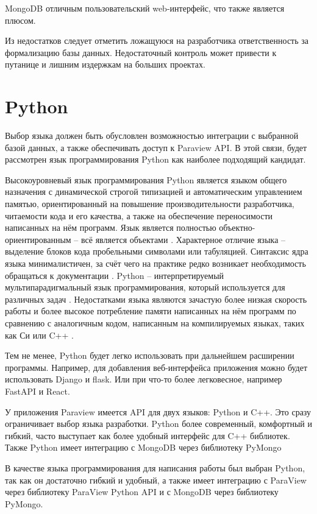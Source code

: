 \documentclass[14pt]{extreport}
\begin{document}
MongoDB отличным пользовательский web-интерфейс, что также является плюсом.

Из недостатков следует отметить ложащуюся на разработчика ответственность за формализацию базы данных. Недостаточный контроль может привести к путанице и лишним издержкам на больших проектах.

\section{Python}
Выбор языка должен быть обусловлен возможностью интеграции с выбранной базой данных, а также обеспечивать доступ к Paraview API. В этой связи, будет рассмотрен язык программирования Python как наиболее подходящий кандидат.

Высокоуровневый язык программирования Python является языком общего назначения с динамической строгой типизацией и автоматическим управлением памятью, ориентированный на повышение производительности разработчика, читаемости кода и его качества, а также на обеспечение переносимости написанных на нём программ. Язык является полностью объектно-ориентированным -- всё является объектами \cite{PythonYogesh}. 
Характерное отличие языка -- выделение блоков кода пробельными символами или табуляцией. Синтаксис ядра языка минималистичен, за счёт чего на практике редко возникает необходимость обращаться к документации \cite{PythonLutz}. Python -- интерпретируемый мультипарадигмальный язык программирования, который используется для различных задач \cite{PythonYogesh}. Недостатками языка являются зачастую более низкая скорость работы и более высокое потребление памяти написанных на нём программ по сравнению с аналогичным кодом, написанным на компилируемых языках, таких как Си или C++ \cite{PythonLutz}. 

Тем не менее, Python будет легко использовать при дальнейшем расширении программы. Например, для добавления веб-интерфейса приложения можно будет использовать Django и flask. Или при что-то более легковесное, например FastAPI и React.

У приложения Paraview имеется API для двух языков: Python и C++. Это сразу ограничивает выбор языка разработки. Python более современный, комфортный и гибкий, часто выступает как более удобный интерфейс для C++ библиотек. Также Python имеет интеграцию с MongoDB через библиотеку PyMongo


В качестве языка программирования для написания работы был выбран Python, так как он достаточно гибкий и удобный, а также имеет интеграцию с ParaView через библиотеку ParaView Python API и с MongoDB через библиотеку PyMongo.
\end{document}
